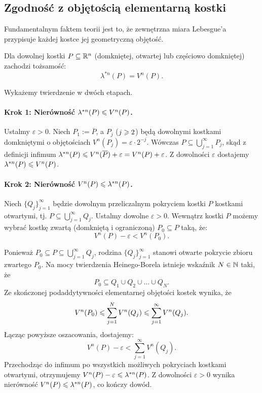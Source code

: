 \subsection{Zgodność z objętością elementarną kostki}
Fundamentalnym faktem teorii jest to, że zewnętrzna miara Lebesgue'a przypisuje każdej kostce jej geometryczną objętość.
\begin{tw} Dla dowolnej kostki $P \subseteq \mathbb{R}^{n}$ (domkniętej, otwartej lub częściowo domkniętej) zachodzi tożsamość: \begin{equation*} \lambda^{*n}(P) = V^n(P). \end{equation*} \end{tw}
\begin{dow} Wykażemy twierdzenie w dwóch etapach.
    \paragraph{Krok 1: Nierówność $\lambda^{*n}(P) \leqslant V^n(P)$.} Ustalmy $\varepsilon > 0$. Niech $P_1 := \overline{P}$, a $P_j$ ($j \geqslant 2$) będą dowolnymi kostkami domkniętymi o objętościach $V^n(P_j) = \varepsilon \cdot 2^{-j}$. Wówczas $P \subseteq \bigcup_{j=1}^\infty P_j$, skąd z definicji infimum $\lambda^{*n}(P) \leqslant V^n(\overline{P}) + \varepsilon = V^n(P) + \varepsilon$. Z dowolności $\varepsilon$ dostajemy $\lambda^{*n}(P) \leqslant V^n(P)$.
    \paragraph{Krok 2: Nierówność $V^n(P) \leqslant \lambda^{*n}(P)$.} Niech $\{Q_j\}_{j=1}^\infty$ będzie dowolnym przeliczalnym pokryciem kostki $P$ kostkami otwartymi, tj. $P \subseteq \bigcup_{j=1}^\infty Q_j$. Ustalmy dowolne $\varepsilon > 0$. Wewnątrz kostki $P$ możemy wybrać kostkę zwartą (domkniętą i ograniczoną) $P_0 \subseteq  P$ taką, że:
    \begin{equation*}
        V^n(P) - \varepsilon < V^n(P_0).
    \end{equation*}

    Ponieważ $P_0 \subseteq  P \subseteq  \bigcup_{j=1}^\infty Q_j$, rodzina $\{Q_j\}_{j=1}^\infty$ stanowi otwarte pokrycie zbioru zwartego $P_0$. Na mocy twierdzenia Heinego-Borela istnieje wskaźnik $N \in \mathbb{N}$ taki, że \begin{equation*} P_0 \subseteq Q_1 \cup Q_2 \cup \dots \cup Q_N. \end{equation*} Ze skończonej podaddytywności elementarnej objętości kostek wynika, że \begin{equation*} V^n(P_0) \leqslant \sum_{j=1}^N V^n(Q_j) \leqslant \sum_{j=1}^\infty V^n(Q_j). \end{equation*} Łącząc powyższe oszacowania, dostajemy:
    \begin{equation*}
        V^n(P) - \varepsilon < \sum_{j=1}^\infty V^n(Q_j).
    \end{equation*} Przechodząc do infimum po wszystkich możliwych pokryciach kostkami otwartymi, otrzymujemy $V^n(P) - \varepsilon \leqslant \lambda^{*n}(P)$. Z dowolności $\varepsilon > 0$ wynika nierówność $V^n(P) \leqslant \lambda^{*n}(P)$, co kończy dowód.
\end{dow}

